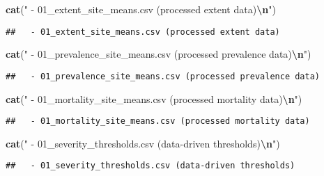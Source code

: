 \documentclass[
]{article}
\newenvironment{Shaded}{\begin{snugshade}}{\end{snugshade}}
\newcommand{\FunctionTok}[1]{\textcolor[rgb]{0.13,0.29,0.53}{\textbf{#1}}}
\newcommand{\NormalTok}[1]{#1}
\newcommand{\SpecialCharTok}[1]{\textcolor[rgb]{0.81,0.36,0.00}{\textbf{#1}}}
\newcommand{\StringTok}[1]{\textcolor[rgb]{0.31,0.60,0.02}{#1}}
\begin{document}
\begin{Shaded}
\begin{Highlighting}[]
\FunctionTok{cat}\NormalTok{(}\StringTok{"  {-} 01\_extent\_site\_means.csv (processed extent data)}\SpecialCharTok{\textbackslash{}n}\StringTok{"}\NormalTok{)}
\end{Highlighting}
\end{Shaded}

\begin{verbatim}
##   - 01_extent_site_means.csv (processed extent data)
\end{verbatim}

\begin{Shaded}
\begin{Highlighting}[]
\FunctionTok{cat}\NormalTok{(}\StringTok{"  {-} 01\_prevalence\_site\_means.csv (processed prevalence data)}\SpecialCharTok{\textbackslash{}n}\StringTok{"}\NormalTok{) }
\end{Highlighting}
\end{Shaded}

\begin{verbatim}
##   - 01_prevalence_site_means.csv (processed prevalence data)
\end{verbatim}

\begin{Shaded}
\begin{Highlighting}[]
\FunctionTok{cat}\NormalTok{(}\StringTok{"  {-} 01\_mortality\_site\_means.csv (processed mortality data)}\SpecialCharTok{\textbackslash{}n}\StringTok{"}\NormalTok{)}
\end{Highlighting}
\end{Shaded}

\begin{verbatim}
##   - 01_mortality_site_means.csv (processed mortality data)
\end{verbatim}

\begin{Shaded}
\begin{Highlighting}[]
\FunctionTok{cat}\NormalTok{(}\StringTok{"  {-} 01\_severity\_thresholds.csv (data{-}driven thresholds)}\SpecialCharTok{\textbackslash{}n}\StringTok{"}\NormalTok{)}
\end{Highlighting}
\end{Shaded}

\begin{verbatim}
##   - 01_severity_thresholds.csv (data-driven thresholds)
\end{verbatim}
\end{document}
